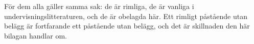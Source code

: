 För dem alla gäller samma sak: de är rimliga, de är vanliga i
undervisningslitteraturen, och de är obelagda här.  Ett rimligt
påstående utan belägg är fortfarande ett påstående utan belägg, och det
är skillnaden den här bilagan handlar om.

